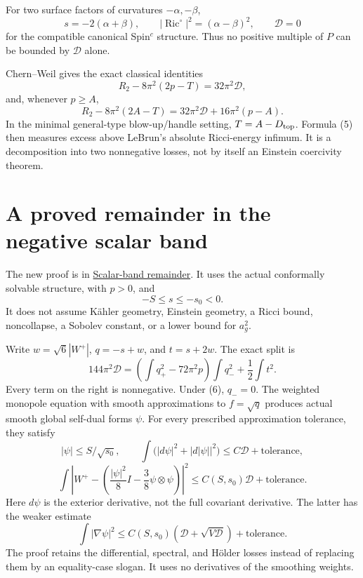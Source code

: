 \documentclass[
  11pt,
]{article}
\begin{document}
For two surface factors of curvatures \(-\alpha,-\beta\), \[
s=-2(\alpha+\beta),\qquad
|\operatorname{Ric}^{\circ}|^2=(\alpha-\beta)^2,\qquad
\mathscr D=0
\] for the compatible canonical Spin\(^c\) structure. Thus no positive
multiple of \(P\) can be bounded by \(\mathscr D\) alone.

Chern--Weil gives the exact classical identities \[
R_2-8\pi^2(2p-T)=32\pi^2\mathscr D,
\tag{4}
\] and, whenever \(p\ge A\), \[
R_2-8\pi^2(2A-T)
=32\pi^2\mathscr D+16\pi^2(p-A).
\tag{5}
\] In the minimal general-type blow-up/handle setting,
\(T=A-D_{\rm top}\). Formula (5) then measures excess above LeBrun's
absolute Ricci-energy infimum. It is a decomposition into two
nonnegative losses, not by itself an Einstein coercivity theorem.

\hypertarget{a-proved-remainder-in-the-negative-scalar-band}{%
\section{A proved remainder in the negative scalar
band}\label{a-proved-remainder-in-the-negative-scalar-band}}

The new proof is in \href{line1_scalar_band_remainder.md}{Scalar-band
remainder}. It uses the actual conformally solvable structure, with
\(p>0\), and \[
-S\le s\le-s_0<0.
\tag{6}
\] It does not assume Kähler geometry, Einstein geometry, a Ricci bound,
noncollapse, a Sobolev constant, or a lower bound for \(a_g^2\).

Write \(w=\sqrt6|W^+|\), \(q=-s+w\), and \(t=s+2w\). The exact split is
\[
144\pi^2\mathscr D
=\left(\int q_+^2-72\pi^2p\right)
  \int q_-^2+\frac12\int t^2 .
\tag{7}
\] Every term on the right is nonnegative. Under (6), \(q_-=0\). The
weighted monopole equation with smooth approximations to \(f=\sqrt q\)
produces actual smooth global self-dual forms \(\psi\). For every
prescribed approximation tolerance, they satisfy \[
|\psi|\le S/\sqrt{s_0},\qquad
\int\bigl(|d\psi|^2+|d|\psi||^2\bigr)
\le C\mathscr D+\text{tolerance},
\tag{8}
\] \[
\int\left|W^+-
\left(\frac{|\psi|^2}{8}I-\frac38\psi\otimes\psi\right)\right|^2
\le C(S,s_0)\mathscr D+\text{tolerance}.
\tag{9}
\] Here \(d\psi\) is the exterior derivative, not the full covariant
derivative. The latter has the weaker estimate \[
\int|\nabla\psi|^2
\le C(S,s_0)\left(\mathscr D+\sqrt{V\mathscr D}\right)
+\text{tolerance}.
\tag{10}
\] The proof retains the differential, spectral, and Hölder losses
instead of replacing them by an equality-case slogan. It uses no
derivatives of the smoothing weights.
\end{document}
